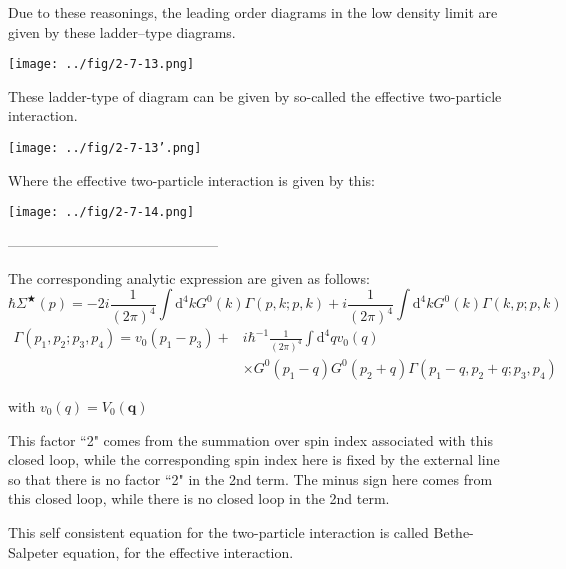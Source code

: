 Due to these reasonings, the leading order diagrams in the low density limit are given by these ladder--type diagrams.
\begin{center}
\texttt{[image: ../fig/2-7-13.png]}\label{Fig2.7.13}
\end{center}

These ladder-type of diagram can be given by so-called the effective two-particle interaction.
\begin{center}
\texttt{[image: ../fig/2-7-13'.png]}\label{Fig2.7.13'}
\begin{equation} \label{Eqs2.7.4}\end{equation}
\end{center}

Where the effective two-particle interaction is given by this:
\begin{center}
\texttt{[image: ../fig/2-7-14.png]}\label{Fig2.7.14}
\begin{equation} \label{Eqs2.7.5}\end{equation}
\end{center}
\begin{center}---------------------------------------------\end{center}
The corresponding analytic expression are given as follows:
\begin{equation*} \label{Eqs2.7.4'} \tag{2.7.4'} \hbar\Sigma^{\bigstar}(p) = -2 i \frac{1}{(2\pi)^4} \int \mathrm{d}^4 k G^0(k) \Gamma(p,k;p,k)+i \frac{1}{(2\pi)^4}\int \mathrm{d}^4 k G^0(k) \Gamma(k,p;p,k) \end{equation*}
\begin{equation} \label{Eqs2.7.6} \begin{split}
\Gamma(p_1,p_2;p_3,p_4) = v_0(p_1-p_3) + &i \hbar^{-1} \frac{1}{(2\pi)^4} \int \mathrm{d}^4 q v_0(q) \\
&\times G^0(p_1-q)G^0(p_2+q)\Gamma(p_1-q,p_2+q;p_3,p_4)
\end{split}\end{equation}

with $v_0(q) = V_0(\mathbf{q})$

This factor ``2" comes from the summation over spin index associated with this closed loop, while the corresponding spin index here is fixed by the external line so that there is no factor ``2" in the 2nd term. The minus sign here comes from this closed loop, while there is no closed loop in the 2nd term.

This self consistent equation for the two-particle interaction is called Bethe-Salpeter equation, for the effective interaction.

